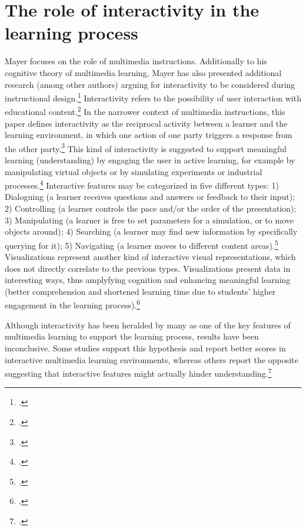 \section{The role of interactivity in the learning process} \label{sec:Interactivity}
Mayer focuses on the role of multimedia instructions. Additionally to his cognitive theory of multimedia learning, Mayer has also presented additional research (among other authors) arguing for interactivity to be considered during instructional design.\footcites[Cf.][chapter 2, paragraph 12]{ClarkElearningscienceinstruction2016} Interactivity refers to the possibility of user interaction with educational content.\footcites[Cf.][p.292]{PatwardhanWhendoeshigher2015} In the narrower context of multimedia instructions, this paper defines interactivity as the reciprocal activity between a learner and the learning environment, in which one action of one party triggers a response from the other party.\footcites[Cf.][p.1025]{DomagkInteractivitymultimedialearning2010} This kind of interactivity is suggested to support meaningful learning (understanding) by engaging the user in active learning, for example by manipulating virtual objects or by simulating experiments or industrial processes.\footcites[Cf.][p.161]{CairncrossInteractiveMultimediaLearning2001}[cf.][p.1159]{Evansinteractivityeffectmultimedia2007} Interactive features may be categorized in five different types: 1) Dialoguing (a learner receives questions and answers or feedback to their input); 2) Controlling (a learner controls the pace and/or the order of the presentation); 3) Manipulating (a learner is free to set parameters for a simulation, or to move objects around); 4) Searching (a learner may find new information by specifically querying for it); 5) Navigating (a learner moves to different content areas).\footcites[Cf.][p.311]{MorenoInteractiveMultimodalLearning2007} Visualizations represent another kind of interactive visual representations, which does not directly correlate to the previous types. Visualizations present data in interesting ways, thus amplyfying cognition and enhancing meaningful learning (better comprehension and shortened learning time due to students' higher engagement in the learning process).\footcites[Cf.][p.294]{PatwardhanWhendoeshigher2015} 

Although interactivity has been heralded by many as one of the key features of multimedia learning to support the learning process, results have been inconclusive. Some studies support this hypothesis and report better scores in interactive multimedia learning environments, whereas others report the opposite suggesting that interactive features might actually hinder understanding.\footcites[Cf.][p.1024]{DomagkInteractivitymultimedialearning2010}[cf.][]{MayerWhenLearningJust2001}[cf.][p.156]{CairncrossInteractiveMultimediaLearning2001}[cf.][pp. 1148 et seq]{Evansinteractivityeffectmultimedia2007}[cf.][p.48]{SordenCognitiveTheoryMultimedia}

